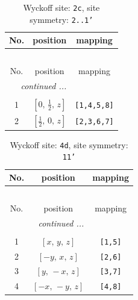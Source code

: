 \documentclass[fleqn,8pt]{jsarticle}
\begin{document}
\begin{longtable}{ccc}
\caption{Wyckoff site: {\tt 2c}, site symmetry: {\tt 2..1'}}
 \\
 \hline \hline
No. & position & mapping \\ \hline \endfirsthead

\multicolumn{2}{l}{\tablename\ \thetable{}} \\
 \hline \hline
No. & position & mapping \\ \hline \endhead

 \hline \hline
\multicolumn{2}{r}{\footnotesize\it continued ...} \\ \endfoot

 \hline \hline
\multicolumn{2}{r}{} \\ \endlastfoot

1 & $\left[ 0,\, \frac{1}{2},\, z \right]$ & {\tt [1,4,5,8]} \\ \hline
2 & $\left[ \frac{1}{2},\, 0,\, z \right]$ & {\tt [2,3,6,7]} \\
\end{longtable}
\renewcommand{\arraystretch}{1.2}
\begin{longtable}{ccc}
\caption{Wyckoff site: {\tt 4d}, site symmetry: {\tt 11'}}
 \\
 \hline \hline
No. & position & mapping \\ \hline \endfirsthead

\multicolumn{2}{l}{\tablename\ \thetable{}} \\
 \hline \hline
No. & position & mapping \\ \hline \endhead

 \hline \hline
\multicolumn{2}{r}{\footnotesize\it continued ...} \\ \endfoot

 \hline \hline
\multicolumn{2}{r}{} \\ \endlastfoot

1 & $\left[ x,\, y,\, z \right]$ & {\tt [1,5]} \\ \hline
2 & $\left[ - y,\, x,\, z \right]$ & {\tt [2,6]} \\ \hline
3 & $\left[ y,\, - x,\, z \right]$ & {\tt [3,7]} \\ \hline
4 & $\left[ - x,\, - y,\, z \right]$ & {\tt [4,8]} \\
\end{longtable}
\end{document}
